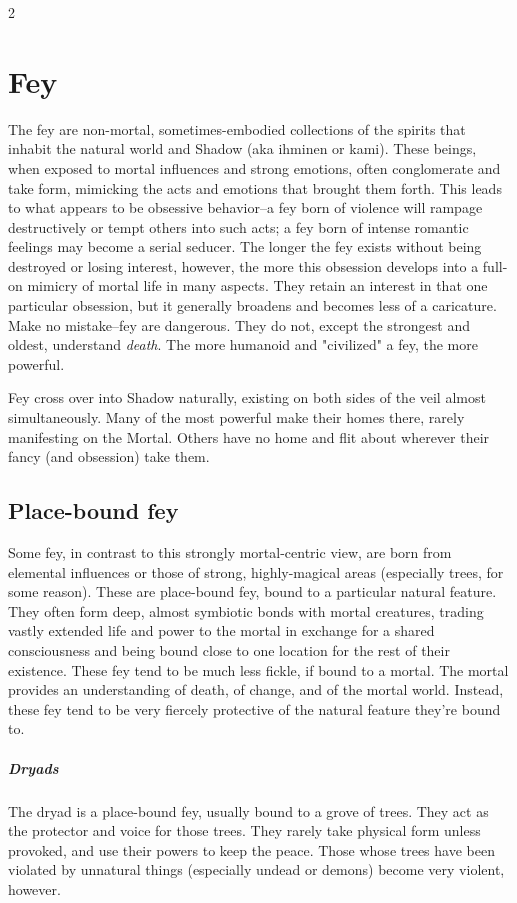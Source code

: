 \clearpage
\begin{multicols}{2}
\section{Fey}
	\raggedcolumns
The fey are non-mortal, sometimes-embodied collections of the spirits that inhabit the natural world and Shadow (aka ihminen or kami). These beings, when exposed to mortal influences and strong emotions, often conglomerate and take form, mimicking the acts and emotions that brought them forth. This leads to what appears to be obsessive behavior--a fey born of violence will rampage destructively or tempt others into such acts; a fey born of intense romantic feelings may become a serial seducer. The longer the fey exists without being destroyed or losing interest, however, the more this obsession develops into a full-on mimicry of mortal life in many aspects. They retain an interest in that one particular obsession, but it generally broadens and becomes less of a caricature. Make no mistake--fey are dangerous. They do not, except the strongest and oldest, understand \textit{death}. The more humanoid and "civilized" a fey, the more powerful.

Fey cross over into Shadow naturally, existing on both sides of the veil almost simultaneously. Many of the most powerful make their homes there, rarely manifesting on the Mortal. Others have no home and flit about wherever their fancy (and obsession) take them.
\subsection{Place-bound fey}
Some fey, in contrast to this strongly mortal-centric view, are born from elemental influences or those of strong, highly-magical areas (especially trees, for some reason). These are place-bound fey, bound to a particular natural feature. They often form deep, almost symbiotic bonds with mortal creatures, trading vastly extended life and power to the mortal in exchange for a shared consciousness and being bound close to one location for the rest of their existence. These fey tend to be much less fickle, if bound to a mortal. The mortal provides an understanding of death, of change, and of the mortal world. Instead, these fey tend to be very fiercely protective of the natural feature they're bound to.

\subparagraph*{Dryads}
The dryad is a place-bound fey, usually bound to a grove of trees. They act as the protector and voice for those trees. They rarely take physical form unless provoked, and use their powers to keep the peace. Those whose trees have been violated by unnatural things (especially undead or demons) become very violent, however.


\end{multicols}

